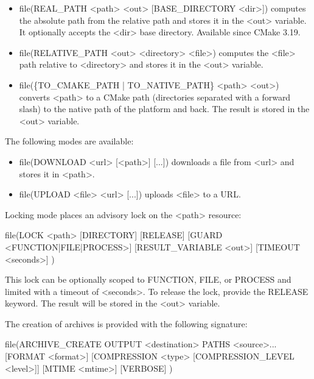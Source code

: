 \begin{itemize}
\item
file(REAL\_PATH <path> <out> [BASE\_DIRECTORY <dir>]) computes the absolute path from the relative path and stores it in the <out> variable. It optionally accepts the <dir> base directory. Available since CMake 3.19.

\item
file(RELATIVE\_PATH <out> <directory> <file>) computes the <file> path relative to <directory> and stores it in the <out> variable.

\item
file(\{TO\_CMAKE\_PATH | TO\_NATIVE\_PATH\} <path> <out>) converts <path> to a CMake path (directories separated with a forward slash) to the native path of the platform and back. The result is stored in the <out> variable.
\end{itemize}


The following modes are available:

\begin{itemize}
\item
file(DOWNLOAD <url> [<path>] [...]) downloads a file from <url> and stores it in <path>.

\item
file(UPLOAD <file> <url> [...]) uploads <file> to a URL.
\end{itemize}


Locking mode places an advisory lock on the <path> resource:

\begin{shell}
file(LOCK <path> [DIRECTORY] [RELEASE]
    [GUARD <FUNCTION|FILE|PROCESS>]
    [RESULT_VARIABLE <out>] [TIMEOUT <seconds>]
)
\end{shell}

This lock can be optionally scoped to FUNCTION, FILE, or PROCESS and limited with a timeout of <seconds>. To release the lock, provide the RELEASE keyword. The result will be stored in the <out> variable.


The creation of archives is provided with the following signature:

\begin{shell}
file(ARCHIVE_CREATE OUTPUT <destination> PATHS <source>...
    [FORMAT <format>]
    [COMPRESSION <type> [COMPRESSION_LEVEL <level>]]
    [MTIME <mtime>] [VERBOSE]
)
\end{shell}

